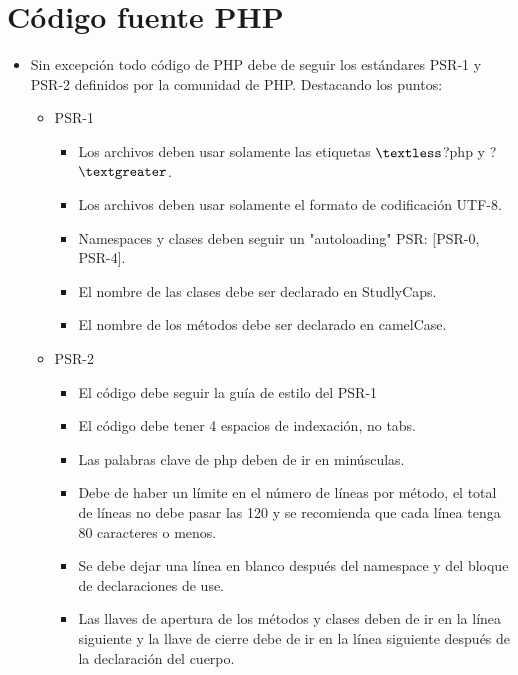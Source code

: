 \section{Código fuente PHP}
\begin{itemize}
\item Sin excepción todo código de PHP debe de seguir los estándares PSR-1 y PSR-2 definidos por la comunidad de PHP. Destacando los puntos:

	\begin{itemize}
		\item PSR-1
			\begin{itemize}
				\item Los archivos deben usar solamente las etiquetas $\textless$?php y ?$\textgreater$.
				\item Los archivos deben usar solamente el formato de codificación UTF-8.

				\item Namespaces y clases deben seguir un "autoloading" PSR: [PSR-0, PSR-4].

				\item El nombre de las clases debe ser declarado en StudlyCaps.
				\item El nombre de los métodos debe ser declarado en camelCase.
			\end{itemize}
			
			\item PSR-2
			\begin{itemize}
				\item El código debe seguir la guía de estilo del PSR-1

				\item El código debe tener 4 espacios de indexación, no tabs.

				\item Las palabras clave de php deben de ir en minúsculas.

				\item Debe de haber un límite en el número de líneas por método, el total de líneas no debe pasar las 120 y se recomienda que cada línea tenga 80 caracteres o menos.

				\item Se debe dejar una línea en blanco después del namespace y del bloque de declaraciones de use.

				\item Las llaves de apertura de los métodos y clases deben de ir en la línea siguiente y la llave de cierre debe de ir en la línea siguiente después de la declaración del cuerpo.


\end{itemize}
\end{itemize}
\end{itemize}
